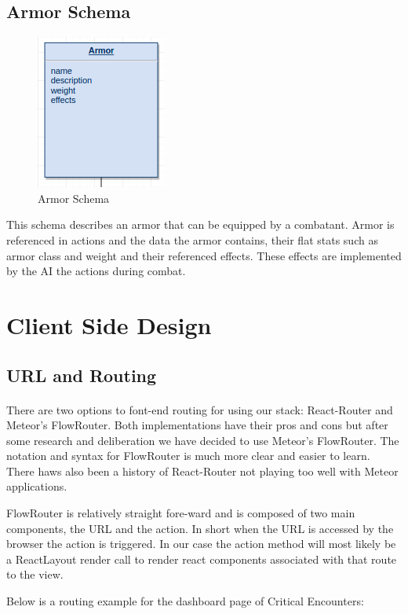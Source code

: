 \documentclass[12pt,a4paper]{report}
\begin{document}
		\subsection {Armor Schema}
		\begin{figure}[H]
			\centering
			\includegraphics[scale=.9]{schema-armor}
			\caption{Armor Schema}
			\label{fig: Armor Schema }
		\end{figure}
		This schema describes an armor that can be equipped by a combatant. Armor is referenced in actions and the data the armor contains, their flat stats such as armor class and weight and their referenced effects. These effects are implemented by the AI the actions during combat.
\newpage
\section{Client Side Design}
	\subsection{URL and Routing}
		\paragraph {} There are two options to font-end routing for using our stack: React-Router and Meteor's FlowRouter. Both implementations have their pros and cons but after some research and deliberation we have decided to use Meteor's FlowRouter. The notation and syntax for FlowRouter is much more clear and easier to learn. There haws also been a history of React-Router not playing too well with Meteor applications. 
		
		FlowRouter is relatively straight fore-ward and is composed of two main components, the URL and the action. In short when the URL is accessed by the browser the action is triggered. In our case the action method will most likely be a ReactLayout render call to render react components associated with that route to the view. 
		
		Below is a routing example for the dashboard page of Critical Encounters:
		
\end{document}
